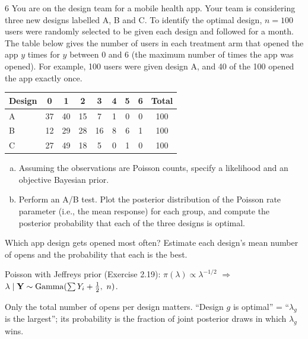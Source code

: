 \documentclass[11pt]{article}
\begin{document}

\begin{problem}{6}
You are on the design team for a mobile health app. Your team is considering three new designs labelled A, B and C. To identify the optimal design, $n=100$ users were randomly selected to be given each design and followed for a month. The table below gives the number of users in each treatment arm that opened the app $y$ times for $y$ between 0 and 6 (the maximum number of times the app was opened). For example, 100 users were given design A, and 40 of the 100 opened the app exactly once.
\begin{center}
\begin{tabular}{l|ccccccc|c}\toprule
Design & 0 & 1 & 2 & 3 & 4 & 5 & 6 & Total\\\midrule
A & 37 & 40 & 15 & 7 & 1 & 0 & 0 & 100\\
B & 12 & 29 & 28 & 16 & 8 & 6 & 1 & 100\\
C & 27 & 49 & 18 & 5 & 0 & 1 & 0 & 100\\\bottomrule
\end{tabular}
\end{center}
\begin{enumerate}[(a)]
\item Assuming the observations are Poisson counts, specify a likelihood and an objective Bayesian prior.
\item Perform an A/B test. Plot the posterior distribution of the Poisson rate parameter (i.e., the mean response) for each group, and compute the posterior probability that each of the three designs is optimal.
\end{enumerate}
\end{problem}

\begin{restate}
Which app design gets opened most often? Estimate each design's mean number of opens and the probability that each is the best.
\end{restate}

\begin{recall}
Poisson with Jeffreys prior (Exercise 2.19): $\pi(\lambda)\propto\lambda^{-1/2}$ $\Rightarrow$ $\lambda\mid\mathbf Y\sim\mathrm{Gamma}(\sum Y_i+\frac12,\ n)$.
\end{recall}

\begin{keyidea}
Only the total number of opens per design matters. ``Design $g$ is optimal'' = ``$\lambda_g$ is the largest''; its probability is the fraction of joint posterior draws in which $\lambda_g$ wins.
\end{keyidea}
\end{document}
